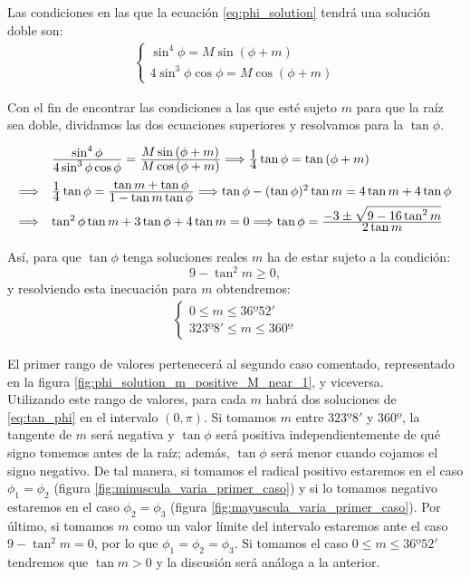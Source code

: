 Las condiciones en las que la ecuación \eqref{eq:phi_solution} tendrá una solución doble son:
\begin{align}
\left\{
\begin{array}{l}
	\sin^4{\phi}=M\sin{(\phi+m)}\\
	4\sin^3{\phi}\cos{\phi}=M\cos{(\phi+m)}
\end{array}
\right.
\label{eq:condicion_raiz_doble}
\end{align}

Con el fin de encontrar las condiciones a las que esté sujeto $m$ para que la raíz sea doble, dividamos las dos ecuaciones superiores y resolvamos para la $\tan{\phi}$.
\begin{align}
\def\arraystretch{2}
\begin{array}{ll}
  & \ddfrac{\sin^4{\phi}}{4\sin^3{\phi}\cos{\phi}}=\ddfrac{M\sin{(\phi+m)}}{M\cos{(\phi+m)}}\Longrightarrow \ddfrac{1}{4}\tan{\phi}=\tan{(\phi+m)}\\
\Longrightarrow & \ddfrac{1}{4}\tan{\phi}=\ddfrac{\tan{m}+\tan{\phi}}{1-\tan{m}\tan{\phi}} \Longrightarrow \tan{\phi}-(\tan{\phi})^2\tan{m}=4\tan{m}+4\tan{\phi}\\
\Longrightarrow & \tan^2{\phi}\tan{m}+3\tan{\phi}+4\tan{m}=0 \Longrightarrow \tan{\phi}=\ddfrac{-3\pm\sqrt{9-16\tan^2{m}}}{2\tan{m}}
\end{array}
\label{eq:tan_phi}
\end{align}

Así, para que $\tan{\phi}$ tenga soluciones reales $m$ ha de estar sujeto a la condición:
\[
9-\tan^2{m}\geq0,
\]
\noindent y resolviendo esta inecuación para $m$ obtendremos:
\begin{align}
\left\{
\begin{array}{l}
	0 \leq m \leq 36º52'\\
	323º8' \leq m \leq 360º
\end{array}
\right.
\label{eq:m_condition}
\end{align}

El primer rango de valores pertenecerá al segundo caso comentado, representado en la figura \ref{fig:phi_solution_m_positive_M_near_1}, y viceversa.\\

Utilizando este rango de valores, para cada $m$ habrá dos soluciones de \eqref{eq:tan_phi} en el intervalo $(0,\pi)$. Si tomamos $m$ entre $323º8'$ y $360º$, la tangente de $m$ será negativa y $\tan{\phi}$ será positiva independientemente de qué signo tomemos antes de la raíz; además, $\tan{\phi}$ será menor cuando cojamos el signo negativo. De tal manera, si tomamos el radical positivo estaremos en el caso $\phi_1=\phi_2$ (figura \ref{fig:minuscula_varia_primer_caso}) y si lo tomamos negativo estaremos en el caso $\phi_2=\phi_3$ (figura \ref{fig:mayuscula_varia_primer_caso}). Por último, si tomamos $m$ como un valor límite del intervalo estaremos ante el caso $9-\tan^2{m}=0$, por lo que $\phi_1=\phi_2=\phi_3$. Si tomamos el caso $0 \leq m \leq 36º52'$ tendremos que $\tan{m}>0$ y la discusión será análoga a la anterior.\\


